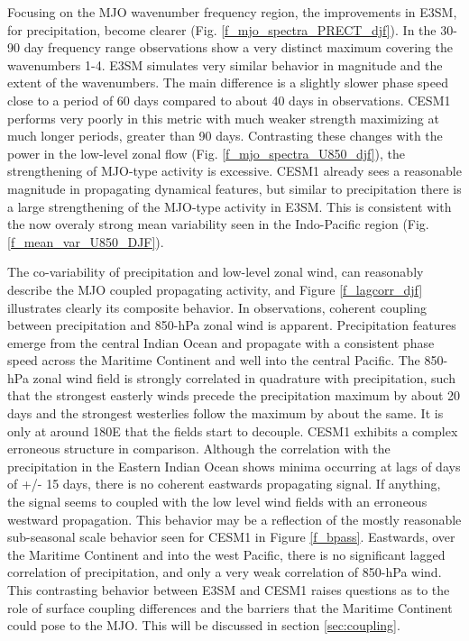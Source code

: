 \documentclass[draft,ms]{AGUTeX}
\begin{document}
\begin{article}
Focusing on the MJO wavenumber frequency region, the improvements in E3SM, for precipitation, become clearer (Fig. \ref{f_mjo_spectra_PRECT_djf}). In the 30-90 day frequency range observations show a very distinct maximum covering the wavenumbers 1-4. E3SM simulates very similar behavior in magnitude and the extent of the wavenumbers. The main difference is a slightly slower phase speed close to a period of 60 days compared to about 40 days in observations. CESM1 performs very poorly in this metric with much weaker strength maximizing at much longer periods, greater than 90 days. Contrasting these changes with the power in the low-level zonal flow (Fig. \ref{f_mjo_spectra_U850_djf}), the strengthening of MJO-type activity is excessive. CESM1 already sees a reasonable magnitude in propagating dynamical features, but similar to precipitation there is a large strengthening of the MJO-type activity in E3SM. This is consistent with the now overaly strong mean variability seen in the Indo-Pacific region (Fig. \ref{f_mean_var_U850_DJF}).

The co-variability of precipitation and low-level zonal wind, can reasonably describe the MJO coupled propagating activity, and Figure \ref{f_lagcorr_djf} illustrates clearly its composite behavior. In observations, coherent coupling between precipitation and 850-hPa zonal wind is apparent. Precipitation features emerge from the central Indian Ocean and propagate with a consistent phase speed across the Maritime Continent and well into the central Pacific. The 850-hPa zonal wind field is strongly correlated in quadrature with precipitation, such that the strongest easterly winds precede the precipitation maximum by about 20 days and the strongest westerlies follow the maximum by about the same. It is only at around 180\deg E that the fields start to decouple. CESM1 exhibits a complex erroneous structure in comparison. Although the correlation with the precipitation in the Eastern Indian Ocean shows minima occurring at lags of days of +/- 15 days, there is no coherent eastwards propagating signal. If anything, the signal seems to coupled with the low level wind fields with an erroneous westward propagation. This behavior may be a reflection of the mostly reasonable sub-seasonal scale behavior seen for CESM1 in Figure \ref{f_bpass}.  Eastwards, over the Maritime Continent and into the west Pacific, there is no significant lagged correlation of precipitation, and only a very weak correlation of 850-hPa wind. This contrasting behavior between E3SM and CESM1 raises questions as to the role of surface coupling differences and the barriers that the Maritime Continent could pose to the MJO. This will be discussed in section \ref{sec:coupling}. 


\end{article}
\end{document}
